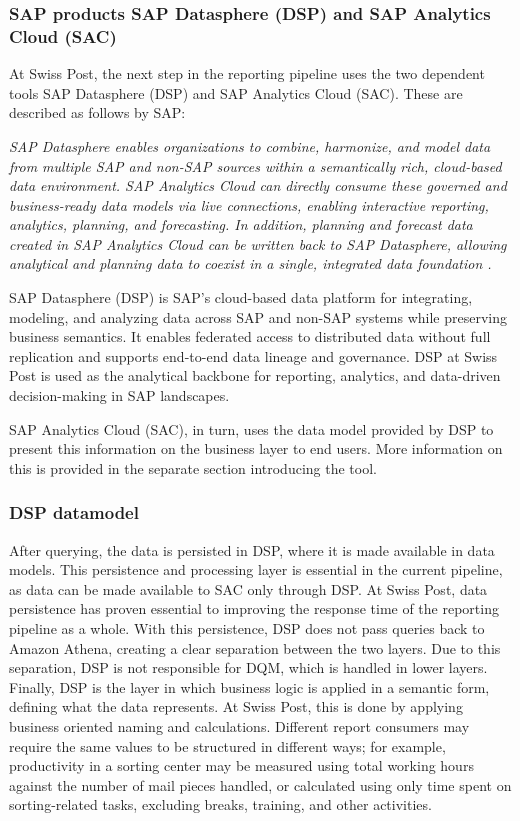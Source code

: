 \subsubsection*{SAP products SAP Datasphere (DSP) and SAP Analytics Cloud (SAC)}
At Swiss Post, the next step in the reporting pipeline uses the two dependent tools SAP Datasphere (DSP) and SAP Analytics Cloud (SAC). These are described as follows by SAP:

\textit{SAP Datasphere enables organizations to combine, harmonize, and model data from multiple SAP and non-SAP sources within a semantically rich, cloud-based data environment. 
SAP Analytics Cloud can directly consume these governed and business-ready data models via live connections, enabling interactive reporting, analytics, planning, and forecasting. 
In addition, planning and forecast data created in SAP Analytics Cloud can be written back to SAP Datasphere, allowing analytical and planning data to coexist in a single, integrated data foundation \cite{sap_datasphere_sac_integration}.}

SAP Datasphere (DSP) is SAP’s cloud-based data platform for integrating, modeling, and analyzing data across SAP and non-SAP systems while preserving business semantics. It enables federated access to distributed data without full replication and supports end-to-end data lineage and governance. DSP at Swiss Post is used as the analytical backbone for reporting, analytics, and data-driven decision-making in SAP landscapes.

SAP Analytics Cloud (SAC), in turn, uses the data model provided by DSP to present this information on the business layer to end users. More information on this is provided in the separate section introducing the tool.


\subsubsection*{DSP datamodel}
\label{SolutionDesignDSPModel}
After querying, the data is persisted in \gls{DSP}, where it is made available in data models. This persistence and processing layer is essential in the current pipeline, as data can be made available to \gls{SAC} only through DSP. At Swiss Post, data persistence has proven essential to improving the response time of the reporting pipeline as a whole.
 With this persistence, DSP does not pass queries back to Amazon Athena, creating a clear separation between the two layers. Due to this separation, DSP is not responsible for DQM, which is handled in lower layers. Finally, DSP is the layer in which business logic is applied in a semantic form, defining what the data represents. At Swiss Post, this is done by applying business oriented naming and calculations. Different report consumers may require the same values to be structured in different ways; for example, productivity in a sorting center may be measured using total working hours against the number of mail pieces handled, or calculated using only time spent on sorting-related tasks, excluding breaks, training, and other activities.
 
